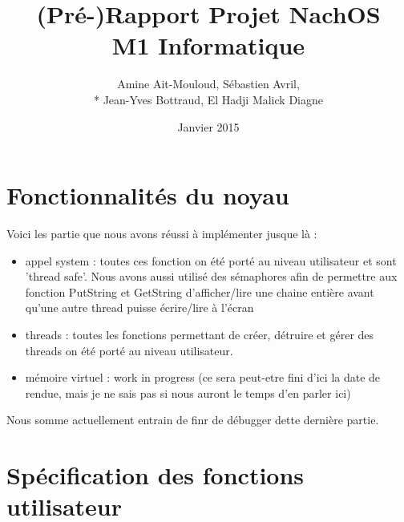 \documentclass{article}
\begin{document}
\title {(Pré-)Rapport Projet NachOS \\ M1 Informatique}
\author{Amine Ait-Mouloud, Sébastien Avril,\\* Jean-Yves Bottraud, El Hadji Malick Diagne}
\date{Janvier 2015}
\maketitle

\tableofcontents
\newpage
\section{Fonctionnalités du noyau}
	Voici les partie que nous avons réussi à implémenter jusque là :
	\begin{itemize}
		\item appel system : toutes ces fonction on été porté au niveau utilisateur et sont 'thread safe'. Nous avons aussi utilisé des sémaphores afin de permettre aux fonction PutString et GetString d'afficher/lire une chaine entière avant qu'une autre thread puisse écrire/lire à l'écran
		\item threads : toutes les fonctions permettant de créer, détruire et gérer des threads on été porté au niveau utilisateur.
		\item mémoire virtuel : work in progress (ce sera peut-etre fini d'ici la date de rendue, mais je ne sais pas si nous auront le temps d'en parler ici)
	\end{itemize}
	Nous somme actuellement entrain de finr de débugger dette dernière partie.

\section{Spécification des fonctions utilisateur}
\end{document}
